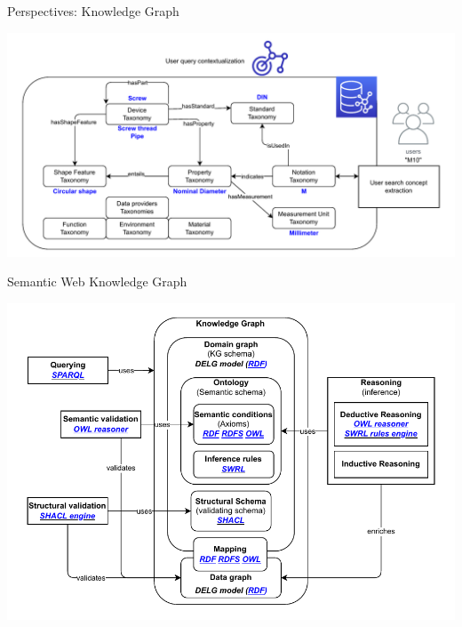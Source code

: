 \begin{frame}{Perspectives: Knowledge Graph}

    \vspace{-1em}
        \begin{center}
            \includegraphics[scale=0.55]{images/semantic_search_example.pdf} 
        \end{center}

\end{frame}

\begin{frame}{Semantic Web Knowledge Graph}
    
        \begin{center}
            \includegraphics[scale=0.6]{images/kg-def-technos.pdf} 
        \end{center}

\end{frame}


